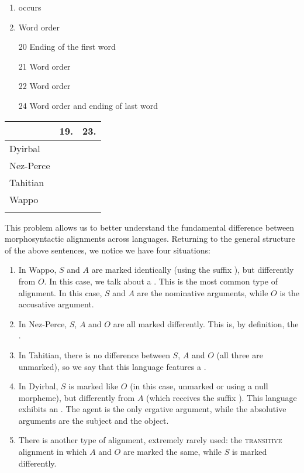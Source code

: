 \begin{refsection}
\begin{mysolution}
\begin{solutions}[start=3]
\begin{enumerate}[start = 17]
        \item {} occurs
        \item Word order
        \item[20] Ending of the first word
        \item[21] Word order
        \item[22] Word order
        \item[24] Word order and ending of last word
    \end{enumerate}
    \item
    \begin{tabularx}{\linewidth}[t]{llQ}
    \lsptoprule
    & {19.} & {23.}\\
    \midrule
    Dyirbal &  &  \\
    Nez-Perce &  &  \\
    Tahitian &  &  \\
    Wappo &  &  \\
    \lspbottomrule
    \end{tabularx}
\end{solutions}

This problem allows us to better understand the fundamental difference between morphosyntactic alignments across languages. Returning to the general structure of the above sentences, we notice we have four situations:

\begin{enumerate}
    \item In Wappo, $S$ and $A$ are marked identically (using the suffix ), but differently from $O$. In this case, we talk about a . This is the most common type of alignment. In this case, $S$ and $A$ are the nominative arguments, while $O$ is the accusative argument.
    \item In Nez-Perce, $S$, $A$ and $O$ are all marked differently. This is, by definition, the .
    \item In Tahitian, there is no difference between $S$, $A$ and $O$ (all three are unmarked), so we say that this language features a .
    \item In Dyirbal, $S$ is marked like $O$ (in this case, unmarked or using a null morpheme), but differently from $A$ (which receives the suffix ). This language exhibits an . The agent is the only ergative argument, while the absolutive arguments are the subject and the object.
    \item There is another type of alignment, extremely rarely used: the \textsc{transitive} alignment in which $A$ and $O$ are marked the same, while $S$ is marked differently.
\end{enumerate}


\end{mysolution}
\end{refsection}
